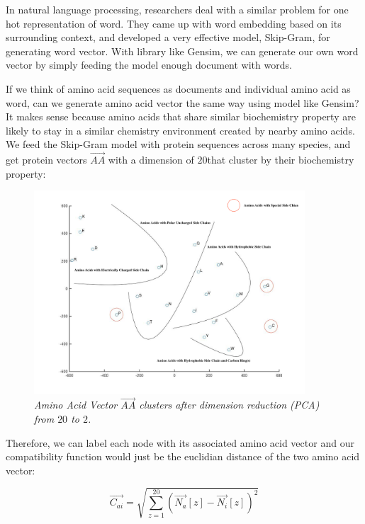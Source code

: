In natural language processing, researchers deal with a similar problem for one hot representation of word. They came up with word embedding based on its surrounding context, and developed a very effective model, Skip-Gram, for generating word vector. With library like Gensim\footnotemark, we can generate our own word vector by simply feeding the model enough document with words.\\

If we think of amino acid sequences as documents and individual amino acid as word, can we generate amino acid vector the same way using model like Gensim? It makes sense because amino acids that share similar biochemistry property are likely to stay in a similar chemistry environment created by nearby amino acids. We feed the Skip-Gram model with protein sequences across many species, and get protein vectors $\overrightarrow{AA}$ with a dimension of $20$\footnotemark that cluster by their biochemistry property:

\begin{figure}[h]
	\centering
	\captionsetup{justification=centering}
	\includegraphics[width=0.9\textwidth]{figs/a2v.png}
	\caption[Caption for LOF]{\emph{Amino Acid Vector $\overrightarrow{AA}$ clusters after dimension reduction (PCA) from $20$ to $2$.}}
	\label{fig:a2v}
\end{figure}

Therefore, we can label each node with its associated amino acid vector and our compatibility function would just be the euclidian distance of the two amino acid vector:

\begin{equation} 
\overrightarrow{C_{ai}}=\sqrt{\sum_{z=1}^{20}(\overrightarrow{N_{a}}[z]-\overrightarrow{N_{i}}[z])^2}
\end{equation}

